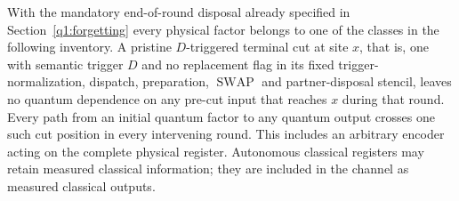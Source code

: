 \begin{lemma}\label{q1:l14}

With the mandatory end-of-round disposal already specified in Section~\ref{q1:forgetting} every physical factor belongs to one of the classes in the following inventory. A pristine \(D\)-triggered terminal cut at site \(x\), that is, one with semantic trigger \(D\) and no replacement flag in its fixed trigger-normalization, dispatch, preparation, \(\operatorname{SWAP}\) and partner-disposal stencil, leaves no quantum dependence on any pre-cut input that reaches \(x\) during that round. Every path from an initial quantum factor to any quantum output crosses one such cut position in every intervening round. This includes an arbitrary encoder acting on the complete physical register. Autonomous classical registers may retain measured classical information; they are included in the channel as measured classical outputs.


\end{lemma}
